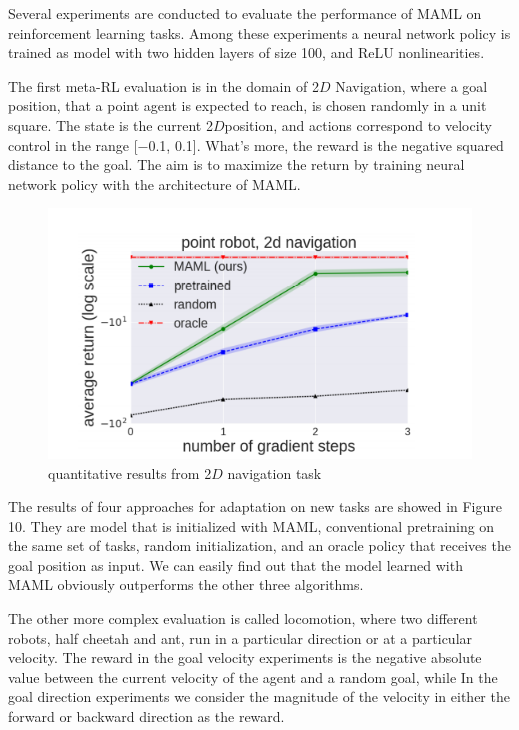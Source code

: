 Several experiments are conducted to evaluate the performance of MAML on reinforcement learning tasks. Among these experiments a neural network policy is trained as model with  two hidden layers of size 100, and ReLU nonlinearities.

The first meta-RL evaluation is in the domain of 2$D$ Navigation, where  a goal position, that a point agent is expected to reach, is chosen randomly in a unit square. The state is the current 2$D$position, and actions correspond to velocity control in the range [−0.1, 0.1]. What's more, the reward is the negative squared distance to the goal. The aim is to maximize the return by training neural network policy with the architecture of MAML.

\begin{figure}[H]
	\includegraphics[scale=0.8]{MAML_04.PNG}
	\centering
	\caption{ quantitative results from 2$D$ navigation task}
	\label{MAML}
\end{figure}

The results of four approaches for adaptation on new tasks are showed in Figure 10. They are model that is initialized with MAML, conventional pretraining on the same set of tasks, random initialization, and an oracle policy that receives the goal position as input. We can easily find out that the model learned with MAML obviously outperforms the other three algorithms.

The other more complex evaluation is called locomotion, where two different robots, half  cheetah and ant, run in a particular direction or at a particular velocity. The reward in the goal velocity experiments is the negative absolute value between the current velocity of
the agent and a random goal, while In the goal direction experiments we consider the magnitude of the velocity in either the forward or backward direction as the reward.

